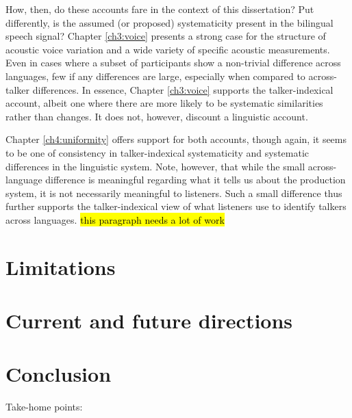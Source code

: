 How, then, do these accounts fare in the context of this dissertation? Put differently, is the assumed (or proposed) systematicity present in the bilingual speech signal? Chapter \ref{ch3:voice} presents a strong case for the structure of acoustic voice variation and a wide variety of specific acoustic measurements. Even in cases where a subset of participants show a non-trivial difference across languages, few if any differences are large, especially when compared to across-talker differences. In essence, Chapter \ref{ch3:voice} supports the talker-indexical account, albeit one where there are more likely to be systematic similarities rather than changes. It does not, however, discount a linguistic account. 

Chapter \ref{ch4:uniformity} offers support for both accounts, though again, it seems to be one of consistency in talker-indexical systematicity and systematic differences in the linguistic system. Note, however, that while the small across-language difference is meaningful regarding what it tells us about the production system, it is not necessarily meaningful to listeners. Such a small difference thus further supports the talker-indexical view of what listeners use to identify talkers across languages. \hl{this paragraph needs a lot of work}


\section{Limitations}\label{ch5:sec:limitations}


\section{Current and future directions}\label{ch5:sec:directions}

\section{Conclusion}\label{ch5:sec:conclusion}Take-home points:


\endinput %
